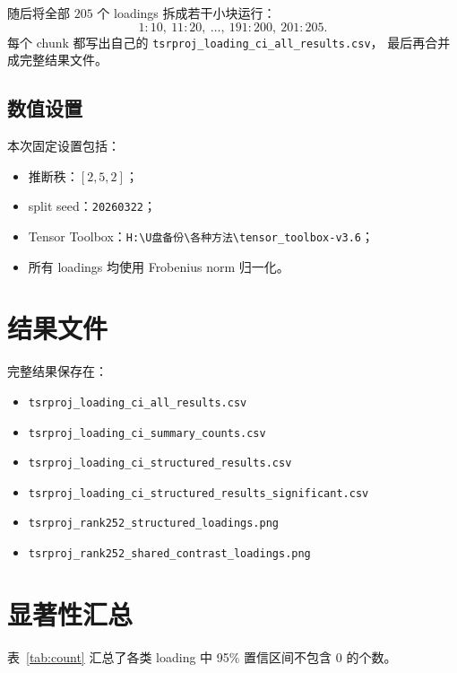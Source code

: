 \documentclass[11pt]{ctexart}
\begin{document}
随后将全部 $205$ 个 loadings 拆成若干小块运行：
\[
1{:}10,\ 11{:}20,\ \ldots,\ 191{:}200,\ 201{:}205.
\]
每个 chunk 都写出自己的
\texttt{tsrproj\_loading\_ci\_all\_results.csv}，
最后再合并成完整结果文件。

\subsection{数值设置}
本次固定设置包括：
\begin{itemize}
\item 推断秩：$[2,5,2]$；
\item split seed：\texttt{20260322}；
\item Tensor Toolbox：\texttt{H:\textbackslash U盘备份\textbackslash 各种方法\textbackslash tensor\_toolbox-v3.6}；
\item 所有 loadings 均使用 Frobenius norm 归一化。
\end{itemize}

\section{结果文件}
完整结果保存在：
\begin{itemize}
\item \texttt{tsrproj\_loading\_ci\_all\_results.csv}
\item \texttt{tsrproj\_loading\_ci\_summary\_counts.csv}
\item \texttt{tsrproj\_loading\_ci\_structured\_results.csv}
\item \texttt{tsrproj\_loading\_ci\_structured\_results\_significant.csv}
\item \texttt{tsrproj\_rank252\_structured\_loadings.png}
\item \texttt{tsrproj\_rank252\_shared\_contrast\_loadings.png}
\end{itemize}

\section{显著性汇总}
表~\ref{tab:count} 汇总了各类 loading 中 95\% 置信区间不包含 $0$ 的个数。
\end{document}
